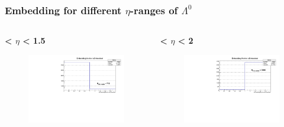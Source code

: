 \documentclass[dvipsnames] {beamer}
\begin{document}
         \begin{frame}
         \frametitle{\bf \centering Embedding for different $\eta$-ranges of $\Lambda^{0}$}
         \begin{columns}
           \begin{block}{\bf {} < $\eta$ < 1.5}
             \begin{figure}[H]
             \includegraphics[width=1.\linewidth]{isEmbedded_eta_10_15.pdf}
             \end{figure}
             
           \end{block}
           \begin{block}{\bf {} < $\eta$ < 2}
               \begin{figure}[H]
                 \includegraphics[width=1.\linewidth]{isEmbedded_eta_15_20.pdf}
               \end{figure}
           \end{block}


\end{columns}
\end{frame}
\end{document}
